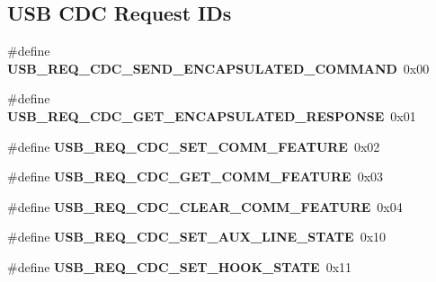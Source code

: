 \subsection*{U\+SB C\+DC Request I\+Ds}
\begin{DoxyCompactItemize}
\item 
\mbox{\label{group__cdc__protocol__group_gac9488d02fd62ae9c3cbaea21a92ab06c}} 
\#define {\bfseries U\+S\+B\+\_\+\+R\+E\+Q\+\_\+\+C\+D\+C\+\_\+\+S\+E\+N\+D\+\_\+\+E\+N\+C\+A\+P\+S\+U\+L\+A\+T\+E\+D\+\_\+\+C\+O\+M\+M\+A\+ND}~0x00
\item 
\mbox{\label{group__cdc__protocol__group_gaea0db4450686edfe7f5ecbd7772db08c}} 
\#define {\bfseries U\+S\+B\+\_\+\+R\+E\+Q\+\_\+\+C\+D\+C\+\_\+\+G\+E\+T\+\_\+\+E\+N\+C\+A\+P\+S\+U\+L\+A\+T\+E\+D\+\_\+\+R\+E\+S\+P\+O\+N\+SE}~0x01
\item 
\mbox{\label{group__cdc__protocol__group_ga84c2ea5b5542b229be667ba6ad81d97f}} 
\#define {\bfseries U\+S\+B\+\_\+\+R\+E\+Q\+\_\+\+C\+D\+C\+\_\+\+S\+E\+T\+\_\+\+C\+O\+M\+M\+\_\+\+F\+E\+A\+T\+U\+RE}~0x02
\item 
\mbox{\label{group__cdc__protocol__group_gaf04ea09f95ab7fb012462f7679c126d4}} 
\#define {\bfseries U\+S\+B\+\_\+\+R\+E\+Q\+\_\+\+C\+D\+C\+\_\+\+G\+E\+T\+\_\+\+C\+O\+M\+M\+\_\+\+F\+E\+A\+T\+U\+RE}~0x03
\item 
\mbox{\label{group__cdc__protocol__group_ga85bffa3729c58e2ac4cbec0c3bc0873c}} 
\#define {\bfseries U\+S\+B\+\_\+\+R\+E\+Q\+\_\+\+C\+D\+C\+\_\+\+C\+L\+E\+A\+R\+\_\+\+C\+O\+M\+M\+\_\+\+F\+E\+A\+T\+U\+RE}~0x04
\item 
\mbox{\label{group__cdc__protocol__group_ga283df094c43680698900ac8fdefb7687}} 
\#define {\bfseries U\+S\+B\+\_\+\+R\+E\+Q\+\_\+\+C\+D\+C\+\_\+\+S\+E\+T\+\_\+\+A\+U\+X\+\_\+\+L\+I\+N\+E\+\_\+\+S\+T\+A\+TE}~0x10
\item 
\mbox{\label{group__cdc__protocol__group_ga193e50f401d74557e36be10f8be0ddbd}} 
\#define {\bfseries U\+S\+B\+\_\+\+R\+E\+Q\+\_\+\+C\+D\+C\+\_\+\+S\+E\+T\+\_\+\+H\+O\+O\+K\+\_\+\+S\+T\+A\+TE}~0x11
\item 

\end{DoxyCompactItemize}
